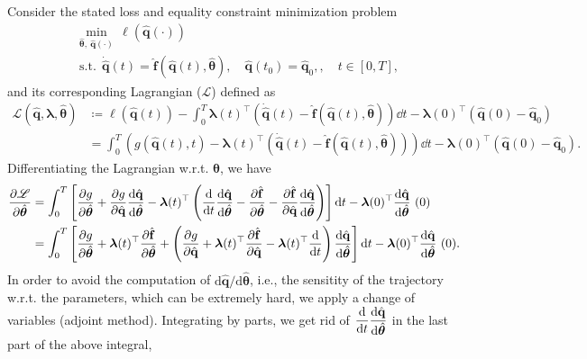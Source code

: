 Consider the stated loss and equality constraint minimization problem\\
\begin{align*}
    &\underset{\hat{\bm{\theta}}, ~\hat{\mathbf{q}}(\cdot) }{\mathrm{min}} ~~\ell (\hat{\mathbf{q}}(\cdot))\\
    &\mathrm{s.t.}~~\dot{\hat{\mathbf{q}}}(t) = \hat{\mathbf{f}}(\hat{\mathbf{q}}(t),\hat{\bm{\theta}}),\quad\hat{\mathbf{q}}(t_0)=\hat{\mathbf{q}}_0,,\quad t\in[0,T],
\end{align*}
and its corresponding  Lagrangian ($\mathscr{L}$) defined as\\
\begin{align*}
    \mathscr{L}(\hat{\mathbf{q}}, \bm{\lambda},\hat{\bm{\theta}}) &\coloneqq \ell(\hat{\mathbf{q}}(t)) - \int_0^T \bm{\lambda}(t)^{\top}\left( \dot{\hat{\mathbf{q}}}(t) - \hat{\mathbf{f}}(\hat{\mathbf{q}}(t),\hat{\bm{\theta}})  \right)\dd t -\bm{\lambda}(0)^{\top}(\hat{\mathbf{q}}(0)-\hat{\mathbf{q}}_0)\\
    &= \int_0^T \left( g(\hat{\mathbf{q}}(t),t) - \bm{\lambda}(t)^{\top}\left( \dot{\hat{\mathbf{q}}}(t) - \hat{\mathbf{f}}(\hat{\mathbf{q}}(t),\hat{\bm{\theta}})  \right) \right)\dd t-\bm{\lambda}(0)^{\top}(\hat{\mathbf{q}}(0)-\hat{\mathbf{q}}_0).
\end{align*}
Differentiating the Lagrangian w.r.t. $\bm{\theta}$, we have\\
\begin{align*}
    \pdv{\mathscr{L}}{\hat{\bm{\theta}}} &= \int_0^T\left[ \pdv{g}{\hat{\bm{\theta}}} + \pdv{g}{\hat{\mathbf{q}}} \dv{\hat{\mathbf{q}}}{\hat{\bm{\theta}}} - \bm{\lambda}(t)^{\top} \left( \dv{t}\dv{\hat{\mathbf{q}}}{\hat{\bm{\theta}}} - \pdv{\hat{\mathbf{f}}}{\hat{\bm{\theta}}} - \pdv{\hat{\mathbf{f}}}{\hat{\mathbf{q}}}\dv{\hat{\mathbf{q}}}{\hat{\bm{\theta}}} \right) \right]\dd t - \bm{\lambda}(0)^{\top}\dv{\hat{\mathbf{q}}}{\hat{\bm{\theta}}}~(0)\notag\\
    &= \int_0^T \left[\pdv{g}{\hat{\bm{\theta}}} + \bm{\lambda}(t)^{\top} \pdv{\hat{\mathbf{f}}}{\hat{\bm{\theta}}}+ \left( \pdv{g}{\hat{\mathbf{q}}} + \bm{\lambda}(t)^{\top}\pdv{\hat{\mathbf{f}}}{\hat{\mathbf{q}}}-\bm{\lambda}(t)^{\top}\dv{t} \right)\dv{\hat{\mathbf{q}}}{\hat{\bm{\theta}}} \right]\dd t- \bm{\lambda}(0)^{\top}\dv{\hat{\mathbf{q}}}{\hat{\bm{\theta}}}~(0). 
\end{align*}
In order to avoid the computation of $\mathrm{d}{\hat{\mathbf{q}}}/\mathrm{d}{\hat{\bm{\theta}}}$, i.e., the sensitity of the trajectory w.r.t. the parameters, which can be extremely hard, we apply a change of variables (adjoint method). Integrating by parts, we get rid of $\displaystyle\dv{t}\dv{\hat{\mathbf{q}}}{\hat{\bm{\theta}}}$ in the last part of the above integral,\\
